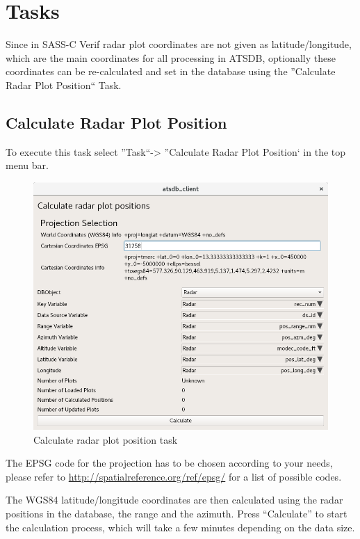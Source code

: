 \section{Tasks}
\label{sec:tasks}

Since in SASS-C Verif radar plot coordinates are not given as latitude/longitude, which are the main coordinates for all processing in ATSDB, optionally these coordinates can be re-calculated and set in the database using the ''Calculate Radar Plot Position`` Task.

\subsection{Calculate Radar Plot Position}
To execute this task select ''Task``->  ''Calculate Radar Plot Position` in the top menu bar.

\begin{figure}[H]
  \center
    \includegraphics[width=14cm,frame]{../screenshots/task_calc_radar.png}
  \caption{Calculate radar plot position task}
  \label{fig:task_calc_radar}
\end{figure}

The EPSG code for the projection has to be chosen according to your needs, please refer to \url{http://spatialreference.org/ref/epsg/} for a list of possible codes.

The WGS84 latitude/longitude coordinates are then calculated using the radar positions in the database, the range and the azimuth. Press ``Calculate'' to start the calculation process, which will take a few minutes depending on the data size. \\

